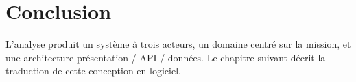 \section{Conclusion}

L'analyse produit un système à trois acteurs, un domaine centré sur la mission, et une architecture présentation / API / données. Le chapitre suivant décrit la traduction de cette conception en logiciel.
